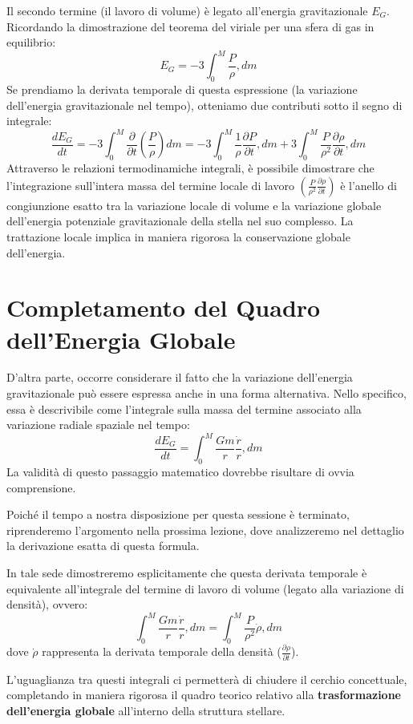 Il secondo termine (il lavoro di volume) è legato all'energia gravitazionale $E_G$. Ricordando la dimostrazione del teorema del viriale per una sfera di gas in equilibrio:
\begin{equation}
E_G = - 3 \int_0^M \frac{P}{\rho} , dm
\end{equation}
Se prendiamo la derivata temporale di questa espressione (la variazione dell'energia gravitazionale nel tempo), otteniamo due contributi sotto il segno di integrale:
\begin{equation}
\frac{d E_G}{dt} = - 3 \int_0^M \frac{\partial}{\partial t}\left(\frac{P}{\rho}\right) dm = - 3 \int_0^M \frac{1}{\rho} \frac{\partial P}{\partial t} , dm + 3 \int_0^M \frac{P}{\rho^2} \frac{\partial \rho}{\partial t} , dm
\end{equation}
Attraverso le relazioni termodinamiche integrali, è possibile dimostrare che l'integrazione sull'intera massa del termine locale di lavoro $\left(\frac{P}{\rho^2} \frac{\partial \rho}{\partial t}\right)$ è l'anello di congiunzione esatto tra la variazione locale di volume e la variazione globale dell'energia potenziale gravitazionale della stella nel suo complesso. La trattazione locale implica in maniera rigorosa la conservazione globale dell'energia.

\section{Completamento del Quadro dell'Energia Globale}

D'altra parte, occorre considerare il fatto che la variazione dell'energia gravitazionale può essere espressa anche in una forma alternativa. Nello specifico, essa è descrivibile come l'integrale sulla massa del termine associato alla variazione radiale spaziale nel tempo:
\begin{equation}
\frac{dE_G}{dt} = \int_0^M \frac{G m}{r} \frac{\dot{r}}{r} , dm
\end{equation}
La validità di questo passaggio matematico dovrebbe risultare di ovvia comprensione.

Poiché il tempo a nostra disposizione per questa sessione è terminato, riprenderemo l'argomento nella prossima lezione, dove analizzeremo nel dettaglio la derivazione esatta di questa formula.

In tale sede dimostreremo esplicitamente che questa derivata temporale è equivalente all'integrale del termine di lavoro di volume (legato alla variazione di densità), ovvero:
\begin{equation}
\int_0^M \frac{G m}{r} \frac{\dot{r}}{r} , dm = \int_0^M \frac{P}{\rho^2} \dot{\rho} , dm
\end{equation}
dove $\dot{\rho}$ rappresenta la derivata temporale della densità ($\frac{\partial \rho}{\partial t}$).

L'uguaglianza tra questi integrali ci permetterà di chiudere il cerchio concettuale, completando in maniera rigorosa il quadro teorico relativo alla \textbf{trasformazione dell'energia globale} all'interno della struttura stellare.